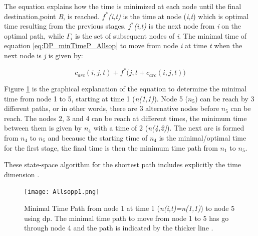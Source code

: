 The equation explains how the time is minimized at each node until the final destination,point \textit{B}, is reached. $f^*$\textit{(i,t)} is the time at node (\textit{i,t}) which is optimal time resulting from the previous stages. $j^*$\textit{(i,t)} is the next node from \textit{i} on the optimal path, while $\Gamma_{i}$ is the set of subsequent nodes of \textit{i}. The minimal time of equation \ref{eq:DP_minTimeP_Allsop} to move from node \textit{i} at time \textit{t} when the next node is \textit{j} is given by:\par 
\begin{equation*}
    c_{arc}(i,j,t)+f^*\Big(j,t + c_{arc}(i,j,t)\Big) 
\end{equation*}

\noindent
Figure \ref{fig:dp_Allsop} is the graphical explanation of the equation to determine the minimal time from node 1 to 5, starting at time 1 (\textit{n(1,1)}). Node 5 ($n_{5}$) can be reach by 3 different paths, or in other words, there are 3 alternative nodes before $n_{5}$ can be reach.  The nodes 2, 3 and 4 can be reach at different times, the minimum time between them is given by $n_{4}$ with a time of 2 (\textit{n(4,2)}). The next arc is formed from $n_{4}$ to $n_{5}$ and because the starting time of $n_{4}$ is the minimal/optimal time for the first stage, the final time is then the minimum time path from $n_{1}$ to $n_{5}$. \par \noindent
These state-space algorithm for the shortest path includes explicitly the time dimension \cite{allsopp1998stochastic}.

\begin{figure}[hbt!]
    \centering
    \texttt{[image: Allsopp1.png]}
    \caption{Minimal Time Path from node 1 at time 1 (\textit{n(i,t)=n(1,1)}) to node 5 using \acrshort{dp}. The minimal time path to move from node 1 to 5 has go through node 4 and the path is indicated by the thicker  line \cite{allsopp2000optimal}.}
    \label{fig:dp_Allsop}
\end{figure}
\par 

